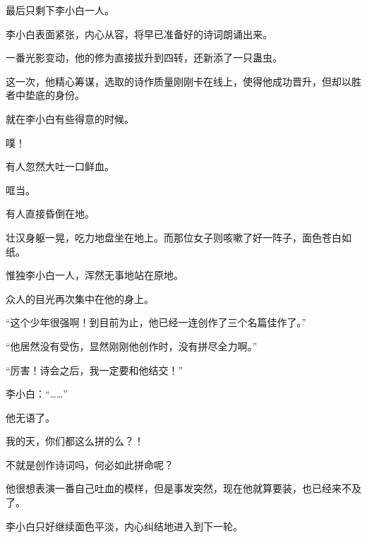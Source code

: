 \begin{this_body}
最后只剩下李小白一人。

李小白表面紧张，内心从容，将早已准备好的诗词朗诵出来。

一番光影变动，他的修为直接拔升到四转，还新添了一只蛊虫。

这一次，他精心筹谋，选取的诗作质量刚刚卡在线上，使得他成功晋升，但却以胜者中垫底的身份。

就在李小白有些得意的时候。

噗！

有人忽然大吐一口鲜血。

哐当。

有人直接昏倒在地。

壮汉身躯一晃，吃力地盘坐在地上。而那位女子则咳嗽了好一阵子，面色苍白如纸。

惟独李小白一人，浑然无事地站在原地。

众人的目光再次集中在他的身上。

“这个少年很强啊！到目前为止，他已经一连创作了三个名篇佳作了。”

“他居然没有受伤，显然刚刚他创作时，没有拼尽全力啊。”

“厉害！诗会之后，我一定要和他结交！”

李小白：“……”

他无语了。

我的天，你们都这么拼的么？！

不就是创作诗词吗，何必如此拼命呢？

他很想表演一番自己吐血的模样，但是事发突然，现在他就算要装，也已经来不及了。

李小白只好继续面色平淡，内心纠结地进入到下一轮。

\end{this_body}

